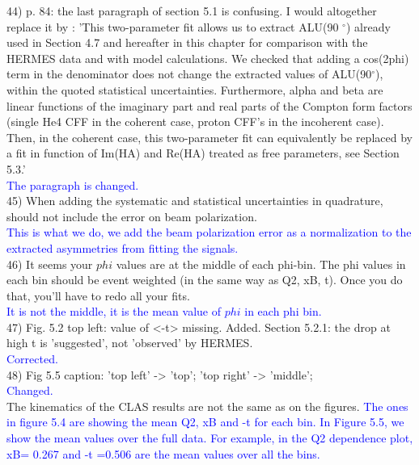 44) p. 84: the last paragraph of section 5.1 is confusing. I would altogether 
replace it by :
'This two-parameter fit allows us to extract ALU(90 $^{\circ}$) already used in 
Section 4.7 and hereafter in this chapter for comparison with the HERMES data 
and with model calculations. We checked that adding a cos(2phi) term in the 
denominator does not change the extracted values of ALU(90$^{\circ}$), within 
the quoted statistical uncertainties. Furthermore, alpha and beta are linear 
functions of the imaginary part and real parts of the Compton form factors 
(single He4 CFF in the coherent case, proton CFF's in the incoherent case).  
Then, in the coherent case, this two-parameter fit can equivalently be replaced 
by a fit in function of Im(HA) and Re(HA) treated as free parameters, see 
Section 5.3.'\\
\textcolor{blue}{ The paragraph is changed.}\\

45) When adding the systematic and statistical uncertainties in quadrature, should 
not include the error on beam polarization.\\
\textcolor{blue}{This is what we do, we add the beam polarization error as a 
normalization to the extracted asymmetries from fitting the signals.}\\

46) It seems your $phi$ values are at the middle of each phi-bin. The phi values in 
each bin should be event weighted (in the same way as Q2, xB, t). Once you do 
that, you'll have to redo all your fits.\\
\textcolor{blue}{ It is not the middle, it is the mean value of $phi$ in each phi 
bin.}\\

47) Fig. 5.2 top left: value of <-t> missing. Added.  Section 5.2.1: the drop 
at high t is 'suggested', not 'observed' by HERMES. \\
\textcolor{blue}{ Corrected.}\\

48) Fig 5.5 caption: 'top left' -> 'top'; 'top right' -> 'middle'; \\
\textcolor{blue}{Changed.}\\
The kinematics of the CLAS results are not the same as on the figures.  
\textcolor{blue}{  The ones in figure 5.4 are showing the mean Q2, xB and -t 
for each bin. In Figure 5.5, we show the mean values over the full data. For 
example, in the Q2 dependence plot, xB= 0.267 and -t =0.506 are the mean values 
over all the bins.}\\   


